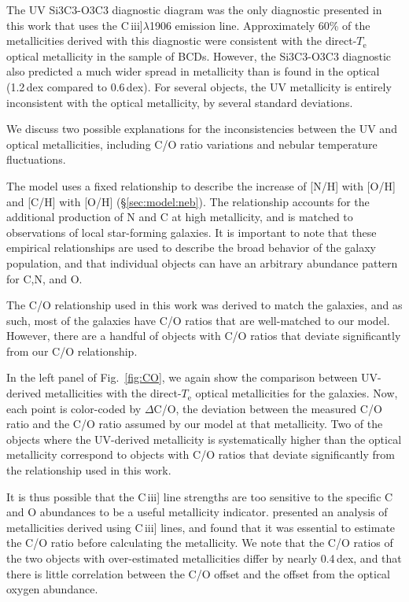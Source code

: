 \documentclass[preprint2]{aastex62}
\newcommand{\ciii}{C\,{\sc iii}]\xspace}
\newcommand{\Te}{\ensuremath{T_{\mathrm{e}}}\xspace}
\begin{document}
The UV Si3C3-O3C3 diagnostic diagram was the only diagnostic presented in this work that uses the \ciii$\lambda$1906 emission line. Approximately 60\% of the metallicities derived with this diagnostic were consistent with the direct-\Te optical metallicity in the \citet{Berg+2016} sample of BCDs. However, the Si3C3-O3C3 diagnostic also predicted a much wider spread in metallicity than is found in the optical (1.2\,dex compared to 0.6\,dex). For several objects, the UV metallicity is entirely inconsistent with the optical metallicity, by several standard deviations.

We discuss two possible explanations for the inconsistencies between the UV and optical metallicities, including C/O ratio variations and nebular temperature fluctuations.

The \citet{Byler+2018} model uses a fixed relationship to describe the increase of [N/H] with [O/H] and [C/H] with [O/H] (\S\ref{sec:model:neb}). The relationship accounts for the additional production of N and C at high metallicity, and is matched to observations of local star-forming galaxies. It is important to note that these empirical relationships are used to describe the broad behavior of the galaxy population, and that individual objects can have an arbitrary abundance pattern for C,N, and O.

The C/O relationship used in this work was derived to match the \citet{Berg+2016} galaxies, and as such, most of the \citet{Berg+2016} galaxies have C/O ratios that are well-matched to our model. However, there are a handful of objects with C/O ratios that deviate significantly from our C/O relationship.

In the left panel of Fig.~\ref{fig:CO}, we again show the comparison between UV-derived metallicities with the direct-\Te optical metallicities for the \citet{Berg+2016} galaxies. Now, each point is color-coded by $\Delta$C/O, the deviation between the measured C/O ratio and the C/O ratio assumed by our model at that metallicity. Two of the objects where the UV-derived metallicity is systematically higher than the optical metallicity correspond to objects with C/O ratios that deviate significantly from the relationship used in this work.

It is thus possible that the \ciii line strengths are too sensitive to the specific C and O abundances to be a useful metallicity indicator. \citet{PerezMontero+2017} presented an analysis of metallicities derived using \ciii lines, and found that it was essential to estimate the C/O ratio before calculating the metallicity. We note that the C/O ratios of the two objects with over-estimated metallicities differ by nearly 0.4\,dex, and that there is little correlation between the C/O offset and the offset from the optical oxygen abundance.
\end{document}
